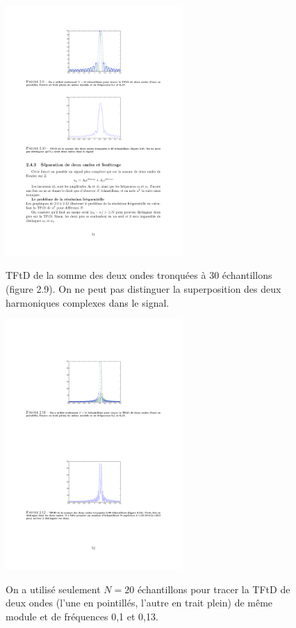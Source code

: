 \begin{definition}
\begin{figure}
  \centering
  \includegraphics[width=0.6\textwidth]{Figures/Figure2-10}\\
  \caption{TFtD de la somme des deux ondes tronqu\'{e}es \`{a} 30 \'{e}chantillons (figure 2.9). On ne peut pas distinguer la superposition des deux harmoniques complexes dans le signal.}\label{fig:figure2-10}
\end{figure}

\begin{figure}
  \centering
  \includegraphics[width=0.6\textwidth]{Figures/Figure2-11}\\
  \caption{On a utilis\'{e} seulement $N=20$ \'{e}chantillons pour tracer la TFtD de deux ondes (l'une en pointill\'{e}s, l'autre en trait plein) de m\^{e}me module et de fr\'{e}quences 0,1 et 0,13.}\label{fig:figure2-11}
\end{figure}



\end{definition}
